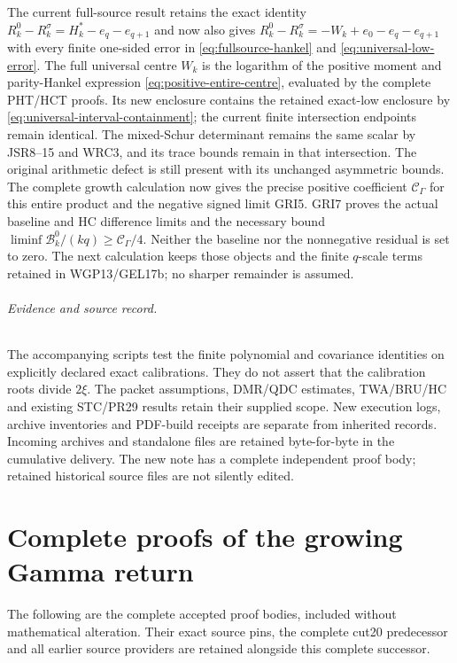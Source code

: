 \documentclass[11pt,a4paper]{article}
\begin{document}
The current full-source result retains the exact identity
$R_k^0-R_k^\sigma=H_k^*-e_q-e_{q+1}$ and now also gives
$R_k^0-R_k^\sigma=-W_k+e_0-e_q-e_{q+1}$ with every finite
one-sided error in \eqref{eq:fullsource-hankel} and
\eqref{eq:universal-low-error}. The full universal centre
$W_k$ is the logarithm of the positive moment and parity-Hankel expression
\eqref{eq:positive-entire-centre}, evaluated by the complete
PHT/HCT proofs. Its new enclosure contains the retained
exact-low enclosure by \eqref{eq:universal-interval-containment};
the current finite intersection endpoints remain identical.
The mixed-Schur determinant remains the same scalar by
JSR8--15 and WRC3, and its trace bounds remain in that intersection.
The original arithmetic defect is still present with its
unchanged asymmetric bounds. The complete growth calculation now
gives the precise positive coefficient $\mathcal C_\Gamma$ for
this entire product and the negative signed limit GRI5.
GRI7 proves the actual baseline and HC difference limits and
the necessary bound $\liminf\mathcal B_k^0/(kq)\geq\mathcal C_\Gamma/4$.
Neither the baseline nor the nonnegative residual is set to zero.
The next calculation keeps those objects and the finite $q$-scale
terms retained in WGP13/GEL17b; no sharper remainder is assumed.

\paragraph{Evidence and source record.}
The accompanying scripts test the finite polynomial and covariance identities on explicitly declared exact calibrations. They do not assert that the calibration roots divide $2\xi$. The packet assumptions, DMR/QDC estimates, TWA/BRU/HC and existing STC/PR29 results retain their supplied scope. New execution logs, archive inventories and PDF-build receipts are separate from inherited records. Incoming archives and standalone files are retained byte-for-byte in the cumulative delivery. The new note has a complete independent proof body; retained historical source files are not silently edited.

\clearpage
\part*{Complete proofs of the growing Gamma return}
The following are the complete accepted proof bodies, included without
mathematical alteration. Their exact source pins, the complete cut20
predecessor and all earlier source providers are retained alongside
this complete successor.


\end{document}
